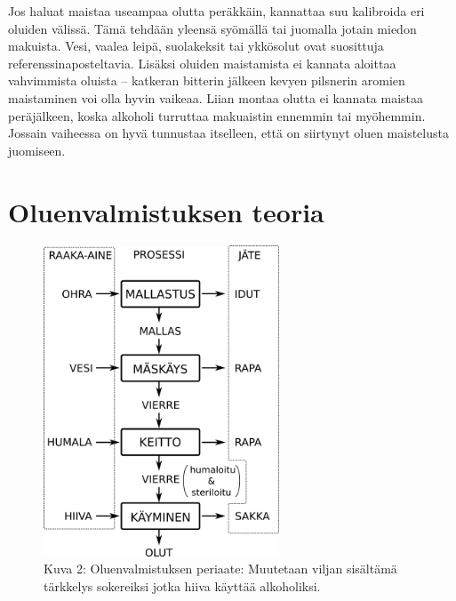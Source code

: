 \documentclass[a4paper,11pt]{report}
\begin{document}
Jos haluat maistaa useampaa olutta peräkkäin, kannattaa suu kalibroida eri oluiden välissä. Tämä tehdään yleensä syömällä tai juomalla jotain miedon makuista. Vesi, vaalea leipä, suolakeksit tai ykkösolut ovat suosittuja referenssinaposteltavia. Lisäksi oluiden maistamista ei kannata aloittaa vahvimmista oluista -- katkeran bitterin jälkeen kevyen pilsnerin aromien maistaminen voi olla hyvin vaikeaa. Liian montaa olutta ei kannata maistaa peräjälkeen, koska alkoholi turruttaa makuaistin ennemmin tai myöhemmin. Jossain vaiheessa on hyvä tunnustaa itselleen, että on siirtynyt oluen maistelusta juomiseen.

\chapter{Oluenvalmistuksen teoria}


\begin{figure}[th]
\centerline{
\includegraphics[width=7cm]{panokaavio.png}
}
\caption{Kuva 2: Oluenvalmistuksen periaate: Muutetaan viljan sisältämä tärkkelys sokereiksi jotka hiiva käyttää alkoholiksi. }
\end{figure}
\end{document}
